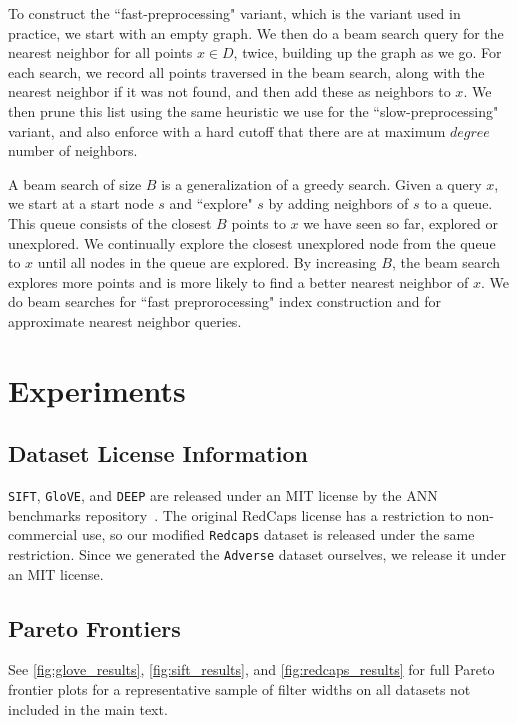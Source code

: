 \documentclass{article}
\theoremstyle{plain}
\theoremstyle{definition}
\theoremstyle{remark}
\newcommand{\julian}[1]{{\color{red}{\bf Julian:} #1}}
\newcommand{\josh}[1]{{\color{orange}{\bf Josh:} #1}}
\newcommand{\degree}{\ensuremath{\textit{degree}}}
\newcommand{\datasetname}[1]{\texttt{#1}}
\begin{document}
To construct the ``fast-preprocessing" variant, which is the variant used in practice, we start with an empty graph. We then do a beam search query for the nearest neighbor for all points $x \in D$, twice, building up the graph as we go. For each  search, we record all points traversed in the beam search, along with the nearest neighbor if it was not found, and then add these as neighbors to $x$. We then prune this list using the same  heuristic we use for the ``slow-preprocessing" variant, and also enforce with a hard cutoff that there are at maximum $\degree{}$ number of neighbors.

A beam search of size $B$ is a generalization of a greedy search. Given a query $x$, we start at a start node $s$ and ``explore" $s$ by adding neighbors of $s$ to a queue. This queue consists of the closest $B$ points to $x$ we have seen so far, explored or unexplored. We continually explore the closest unexplored node from the queue to $x$ until all nodes in the queue are explored. By increasing $B$, the beam search explores more points and is more likely to find a better nearest neighbor of $x$. We do beam searches for ``fast preprorocessing" index construction and for approximate nearest neighbor queries.

\section{Experiments}\label{sec:experiments-appendix}

\subsection{Dataset License Information}
\label{app:licensing}
\datasetname{SIFT}, \datasetname{GloVE}, and \datasetname{DEEP} are released under an MIT license by the ANN benchmarks repository~\cite{aumuller2020ann}. The original RedCaps license has a
restriction to non-commercial use, so our modified \datasetname{Redcaps} dataset
is released under the same restriction. Since we generated the \datasetname{Adverse} dataset ourselves, we release it under an MIT license.



\subsection{Pareto Frontiers}\label{sec:pareto}
See \cref{fig:glove_results}, \cref{fig:sift_results}, and \cref{fig:redcaps_results}  for full Pareto frontier plots for a representative sample of filter widths on all datasets not included in the main text.
\end{document}
